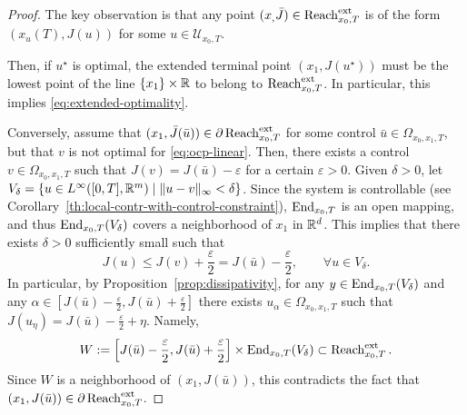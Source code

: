 \begin{proof}
    The key observation is that any point $(x_,\bar J)\in \operatorname{Reach}^{\text{ext}}_{x_0,T}$ is of the form $(x_u(T), J(u))$ for some $u\in \mathcal U_{x_0,T}$.

    Then, if $u^\star$ is optimal, the extended terminal point $(x_1,J(u^\star))$ must be the lowest point of the line $\{x_1\}\times \mathbb{R}$ to belong to $\operatorname{Reach}^{\text{ext}}_{x_0,T}$. In particular, this implies \eqref{eq:extended-optimality}.
    
    Conversely, assume that $(x_1,\bar J(\bar u))\in \partial \operatorname{Reach}^{\text{ext}}_{x_0,T}$ for some control $\bar u\in \Omega_{x_0,x_1,T}$, but that $v$ is not optimal for \eqref{eq:ocp-linear}.
    Then, there exists a control $v\in \Omega_{x_0,x_1,T}$ such that $J(v)=J(\bar u)-\varepsilon$ for a certain $\varepsilon>0$.
% 
    Given $\delta>0$, let $V_\delta = \{ u \in L^\infty([0,T],\mathbb{R}^m)\mid \|u-v\|_\infty<\delta\}$. 
    Since the system is controllable (see Corollary~\ref{th:local-contr-with-control-constraint}), $\operatorname{End}_{x_0,T}$ is an open mapping, and thus $\operatorname{End}_{x_0,T}(V_\delta)$ covers a neighborhood of $x_1$ in $\mathbb{R}^d$.
    This implies that there exists $\delta>0$ sufficiently small such that 
    \begin{equation}
        J(u) \le J(v)+\frac\varepsilon2 = J(\bar u)-\frac{\varepsilon}2, \qquad \forall u\in V_\delta.
    \end{equation}
    In particular, by Proposition~\ref{prop:dissipativity}, for any $y\in \operatorname{End}_{x_0,T}(V_\delta)$ and any $\alpha\in [J(\bar u)-\frac{\varepsilon}2,J(\bar u)+\frac{\varepsilon}2]$ there exists $u_\alpha\in \Omega_{x_0,x_1,T}$ such that $J(u_\eta) = J(\bar u)-\frac{\varepsilon}2 + \eta$. Namely,
    \begin{equation}
       W:=\left[J(\bar u)-\frac{\varepsilon}2,J(\bar u)+\frac{\varepsilon}2\right] \times  \operatorname{End}_{x_0,T}(V_\delta) \subset \operatorname{Reach}^{\text{ext}}_{x_0,T}.
    \end{equation}
    Since $W$ is a neighborhood of $(x_1,J(\bar u))$, this contradicts the fact that $(x_1,J(\bar u))\in \partial \operatorname{Reach}^{\text{ext}}_{x_0,T}$.
\end{proof}



